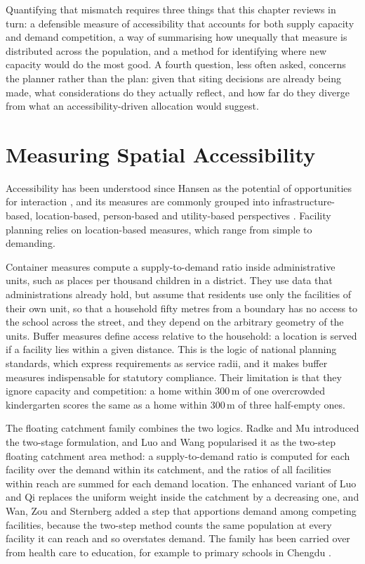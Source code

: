 Quantifying that mismatch requires three things that this chapter reviews in turn: a defensible measure of accessibility that accounts for both supply capacity and demand competition, a way of summarising how unequally that measure is distributed across the population, and a method for identifying where new capacity would do the most good. A fourth question, less often asked, concerns the planner rather than the plan: given that siting decisions are already being made, what considerations do they actually reflect, and how far do they diverge from what an accessibility-driven allocation would suggest.

\section{Measuring Spatial Accessibility}
\label{sec:accessibility-measures}

Accessibility has been understood since Hansen as the potential of opportunities for interaction \cite{hansen1959}, and its measures are commonly grouped into infrastructure-based, location-based, person-based and utility-based perspectives \cite{geurs2004}. Facility planning relies on location-based measures, which range from simple to demanding.

Container measures compute a supply-to-demand ratio inside administrative units, such as places per thousand children in a district. They use data that administrations already hold, but assume that residents use only the facilities of their own unit, so that a household fifty metres from a boundary has no access to the school across the street, and they depend on the arbitrary geometry of the units. Buffer measures define access relative to the household: a location is served if a facility lies within a given distance. This is the logic of national planning standards, which express requirements as service radii, and it makes buffer measures indispensable for statutory compliance. Their limitation is that they ignore capacity and competition: a home within 300\,m of one overcrowded kindergarten scores the same as a home within 300\,m of three half-empty ones.

The floating catchment family combines the two logics. Radke and Mu \cite{radke2000} introduced the two-stage formulation, and Luo and Wang \cite{luo2003} popularised it as the two-step floating catchment area method: a supply-to-demand ratio is computed for each facility over the demand within its catchment, and the ratios of all facilities within reach are summed for each demand location. The enhanced variant of Luo and Qi \cite{luo2009} replaces the uniform weight inside the catchment by a decreasing one, and Wan, Zou and Sternberg \cite{wan2012} added a step that apportions demand among competing facilities, because the two-step method counts the same population at every facility it can reach and so overstates demand. The family has been carried over from health care to education, for example to primary schools in Chengdu \cite{chengdu2024}.


